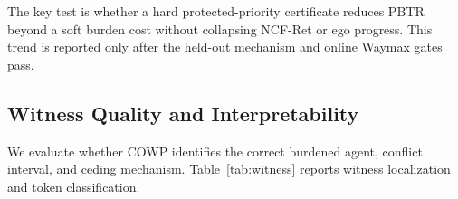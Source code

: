 \documentclass[10pt]{article}
\begin{document}
\begin{table}[t]
\centering
\caption{Ablation study of COWP components.}
\label{tab:ablation}
\end{table}

The key test is whether a hard protected-priority certificate reduces PBTR beyond a soft burden cost without collapsing NCF-Ret or ego progress. This trend is reported only after the held-out mechanism and online Waymax gates pass.

\subsection{Witness Quality and Interpretability}
\label{sec:witness_quality}

We evaluate whether COWP identifies the correct burdened agent, conflict interval, and ceding mechanism. Table~\ref{tab:witness} reports witness localization and token classification.

\begin{table}[t]
\centering
\caption{Coercion witness quality.}
\label{tab:witness}
\end{table}
\end{document}
